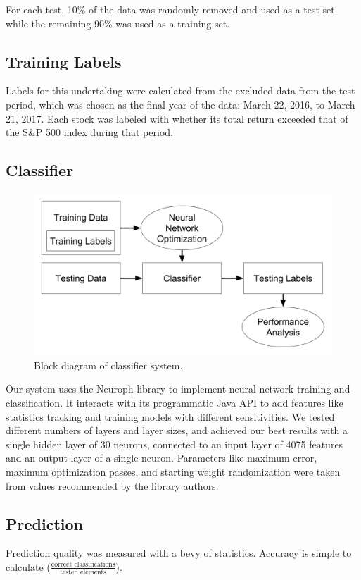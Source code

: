 \documentclass[format=acmlarge]{acmart}
\begin{document}
For each test, 10\% of the data was randomly removed and used as a test set while the remaining 90\% was used as a training set.

\subsection{Training Labels}
Labels for this undertaking were calculated from the excluded data from the test period, which was chosen as the final year of the data:  March 22, 2016, to March 21, 2017.  Each stock was labeled with whether its total return exceeded that of the S\&P 500 index during that period.

\subsection{Classifier}
\begin{figure}
  \includegraphics{block-diagram}
  \caption{Block diagram of classifier system.}
  \label{fig:one}
\end{figure}

Our system uses the Neuroph library to implement neural network training and classification.  It interacts with its programmatic Java API to add features like statistics tracking and training models with different sensitivities.  We tested different numbers of layers and layer sizes, and achieved our best results with a single hidden layer of 30 neurons, connected to an input layer of 4075 features and an output layer of a single neuron.  Parameters like maximum error, maximum optimization passes, and starting weight randomization were taken from values recommended by the library authors.

\subsection{Prediction}
Prediction quality was measured with a bevy of statistics.  Accuracy is simple to calculate ($\frac{\textrm{correct classifications}}{\textrm{tested elements}}$).
\end{document}
